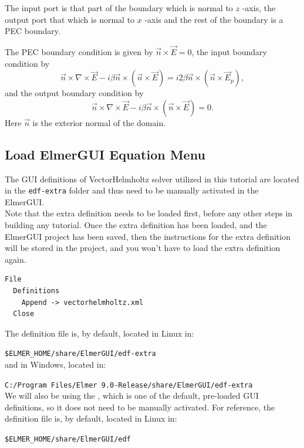 The input port is that part of the boundary which is normal to $z$ -axis, the output port that which is normal to $x$ -axis and the rest of the boundary is a PEC boundary.

The PEC boundary condition is given by $\vec n \times \vec E = 0$, the input boundary condition by
\[\vec n \times \nabla \times \vec E - i\beta \vec n \times 
        (\vec n \times \vec E) = i2\beta \vec n \times 
                                     (\vec n \times \vec E_p),\]
and the output boundary condition by \[\vec n \times \nabla \times \vec E - i\beta \vec n \times (\vec n \times \vec E)=0.\] Here $\vec n$ is the exterior normal of the domain.

\subsection*{Load ElmerGUI Equation Menu}

The GUI definitions of VectorHelmholtz solver utilized in this tutorial are located in the \texttt{edf-extra} folder and thus need to be manually activated in the ElmerGUI.\\

Note that the extra definition needs to be loaded first, before any other steps in building any tutorial.  Once the extra definition has been loaded, and the ElmerGUI project has been saved, then the instructions for the extra definition will be stored in the project, and you won't have to load the extra definition again.

\begin{verbatim}
File
  Definitions
    Append -> vectorhelmholtz.xml
  Close
\end{verbatim}

The \texttt{} definition file is, by default, located in Linux in:

\texttt{\$ELMER\_HOME/share/ElmerGUI/edf-extra}\\

and in Windows, located in:

\texttt{C:/Program Files/Elmer 9.0-Release/share/ElmerGUI/edf-extra}\\

We will also be using the , which is one of the default, pre-loaded GUI definitions, so it does not need to be manually activated.  For reference, the  \texttt{} definition file is, by default, located in Linux in:

\texttt{\$ELMER\_HOME/share/ElmerGUI/edf}\\

